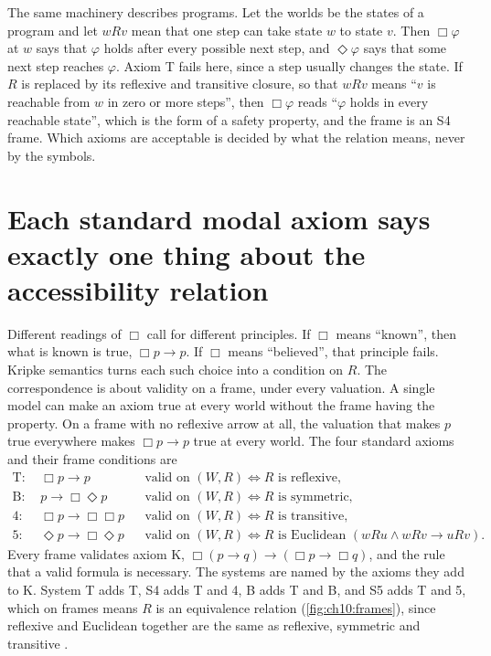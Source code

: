 The same machinery describes programs. Let the worlds be the states of a program and let $wRv$ mean that one step can take state $w$ to state $v$. Then $\Box\varphi$ at $w$ says that $\varphi$ holds after every possible next step, and $\Diamond\varphi$ says that some next step reaches $\varphi$. Axiom T fails here, since a step usually changes the state. If $R$ is replaced by its reflexive and transitive closure, so that $wRv$ means ``$v$ is reachable from $w$ in zero or more steps'', then $\Box\varphi$ reads ``$\varphi$ holds in every reachable state'', which is the form of a safety property, and the frame is an S4 frame. Which axioms are acceptable is decided by what the relation means, never by the symbols.


\section{Each standard modal axiom says exactly one thing about the accessibility relation}\label{sec:ch10:frames}

Different readings of $\Box$ call for different principles. If $\Box$ means ``known'', then what is known is true, $\Box p\to p$. If $\Box$ means ``believed'', that principle fails. Kripke semantics turns each such choice into a condition on $R$. The correspondence is about validity on a frame, under every valuation. A single model can make an axiom true at every world without the frame having the property. On a frame with no reflexive arrow at all, the valuation that makes $p$ true everywhere makes $\Box p\to p$ true at every world. The four standard axioms and their frame conditions are
\begin{equation}
\begin{aligned}
\mathrm{T}\colon\ &\Box p\to p &&\text{valid on }(W,R)\iff R\text{ is reflexive},\\
\mathrm{B}\colon\ &p\to\Box\Diamond p &&\text{valid on }(W,R)\iff R\text{ is symmetric},\\
\mathrm{4}\colon\ &\Box p\to\Box\Box p &&\text{valid on }(W,R)\iff R\text{ is transitive},\\
\mathrm{5}\colon\ &\Diamond p\to\Box\Diamond p &&\text{valid on }(W,R)\iff R\text{ is Euclidean } (wRu\wedge wRv\to uRv).
\end{aligned}
\label{eq:ch10:correspondence}
\end{equation}
Every frame validates axiom K, $\Box(p\to q)\to(\Box p\to\Box q)$, and the rule that a valid formula is necessary. The systems are named by the axioms they add to K. System T adds T, S4 adds T and 4, B adds T and B, and S5 adds T and 5, which on frames means $R$ is an equivalence relation (\cref{fig:ch10:frames}), since reflexive and Euclidean together are the same as reflexive, symmetric and transitive \citep{hughescresswell1996,blackburn2001}.

